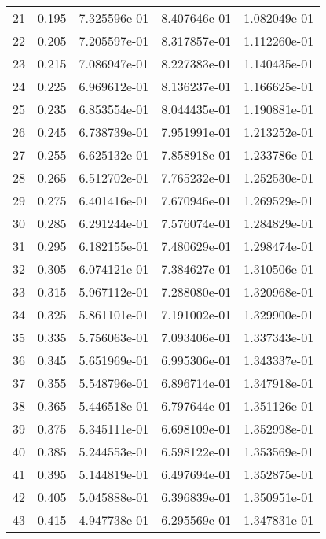 \begin{table}[ht]
\begin{tabular}{rcccc}
    21 &  0.195 &    7.325596e-01 &    8.407646e-01  &     1.082049e-01\\ 
    22 &  0.205 &    7.205597e-01 &    8.317857e-01  &     1.112260e-01\\ 
    23 &  0.215 &    7.086947e-01 &    8.227383e-01  &     1.140435e-01\\ 
    24 &  0.225 &    6.969612e-01 &    8.136237e-01  &     1.166625e-01\\ 
    25 &  0.235 &    6.853554e-01 &    8.044435e-01  &     1.190881e-01\\ 
    26 &  0.245 &    6.738739e-01 &    7.951991e-01  &     1.213252e-01\\ 
    27 &  0.255 &    6.625132e-01 &    7.858918e-01  &     1.233786e-01\\ 
    28 &  0.265 &    6.512702e-01 &    7.765232e-01  &     1.252530e-01\\ 
    29 &  0.275 &    6.401416e-01 &    7.670946e-01  &     1.269529e-01\\ 
    30 &  0.285 &    6.291244e-01 &    7.576074e-01  &     1.284829e-01\\ 
    31 &  0.295 &    6.182155e-01 &    7.480629e-01  &     1.298474e-01\\ 
    32 &  0.305 &    6.074121e-01 &    7.384627e-01  &     1.310506e-01\\ 
    33 &  0.315 &    5.967112e-01 &    7.288080e-01  &     1.320968e-01\\ 
    34 &  0.325 &    5.861101e-01 &    7.191002e-01  &     1.329900e-01\\ 
    35 &  0.335 &    5.756063e-01 &    7.093406e-01  &     1.337343e-01\\ 
    36 &  0.345 &    5.651969e-01 &    6.995306e-01  &     1.343337e-01\\ 
    37 &  0.355 &    5.548796e-01 &    6.896714e-01  &     1.347918e-01\\ 
    38 &  0.365 &    5.446518e-01 &    6.797644e-01  &     1.351126e-01\\ 
    39 &  0.375 &    5.345111e-01 &    6.698109e-01  &     1.352998e-01\\ 
    40 &  0.385 &    5.244553e-01 &    6.598122e-01  &     1.353569e-01\\ 
    41 &  0.395 &    5.144819e-01 &    6.497694e-01  &     1.352875e-01\\ 
    42 &  0.405 &    5.045888e-01 &    6.396839e-01  &     1.350951e-01\\ 
    43 &  0.415 &    4.947738e-01 &    6.295569e-01  &     1.347831e-01\\ 

\end{tabular}
\end{table}
